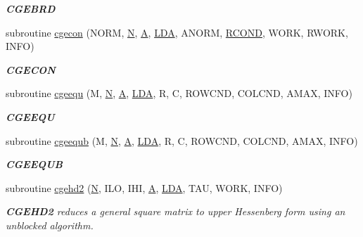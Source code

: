 \begin{DoxyCompactItemize}
\begin{DoxyCompactList}\small\item\em {\bfseries C\+G\+E\+B\+R\+D} \end{DoxyCompactList}\item 
subroutine \hyperlink{group__complexGEcomputational_gaa2ad4e4b1c9cb56a23dd49a798aa9bc8}{cgecon} (N\+O\+R\+M, \hyperlink{polmisc_8c_a0240ac851181b84ac374872dc5434ee4}{N}, \hyperlink{classA}{A}, \hyperlink{example__user_8c_ae946da542ce0db94dced19b2ecefd1aa}{L\+D\+A}, A\+N\+O\+R\+M, \hyperlink{superlu__enum__consts_8h_af00a42ecad444bbda75cde1b64bd7e72a9b5c151728d8512307565994c89919d5}{R\+C\+O\+N\+D}, W\+O\+R\+K, R\+W\+O\+R\+K, I\+N\+F\+O)
\begin{DoxyCompactList}\small\item\em {\bfseries C\+G\+E\+C\+O\+N} \end{DoxyCompactList}\item 
subroutine \hyperlink{group__complexGEcomputational_ga5f98777e93c2142155328be608e4962d}{cgeequ} (M, \hyperlink{polmisc_8c_a0240ac851181b84ac374872dc5434ee4}{N}, \hyperlink{classA}{A}, \hyperlink{example__user_8c_ae946da542ce0db94dced19b2ecefd1aa}{L\+D\+A}, R, C, R\+O\+W\+C\+N\+D, C\+O\+L\+C\+N\+D, A\+M\+A\+X, I\+N\+F\+O)
\begin{DoxyCompactList}\small\item\em {\bfseries C\+G\+E\+E\+Q\+U} \end{DoxyCompactList}\item 
subroutine \hyperlink{group__complexGEcomputational_gaf527e1b73b72fd18b249ff470f02032e}{cgeequb} (M, \hyperlink{polmisc_8c_a0240ac851181b84ac374872dc5434ee4}{N}, \hyperlink{classA}{A}, \hyperlink{example__user_8c_ae946da542ce0db94dced19b2ecefd1aa}{L\+D\+A}, R, C, R\+O\+W\+C\+N\+D, C\+O\+L\+C\+N\+D, A\+M\+A\+X, I\+N\+F\+O)
\begin{DoxyCompactList}\small\item\em {\bfseries C\+G\+E\+E\+Q\+U\+B} \end{DoxyCompactList}\item 
subroutine \hyperlink{group__complexGEcomputational_ga4fdab2d1a2dd6e2218ea983a24c1c686}{cgehd2} (\hyperlink{polmisc_8c_a0240ac851181b84ac374872dc5434ee4}{N}, I\+L\+O, I\+H\+I, \hyperlink{classA}{A}, \hyperlink{example__user_8c_ae946da542ce0db94dced19b2ecefd1aa}{L\+D\+A}, T\+A\+U, W\+O\+R\+K, I\+N\+F\+O)
\begin{DoxyCompactList}\small\item\em {\bfseries C\+G\+E\+H\+D2} reduces a general square matrix to upper Hessenberg form using an unblocked algorithm. \end{DoxyCompactList}\item 

\end{DoxyCompactItemize}
